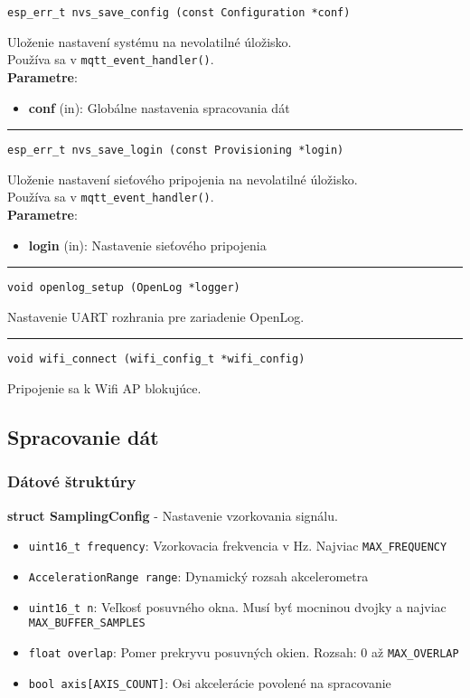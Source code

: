 \begin{lstlisting}[style=docs]
esp_err_t nvs_save_config (const Configuration *conf)
\end{lstlisting}
   Uloženie nastavení systému na nevolatilné úložisko. \\ Používa sa v \verb|mqtt_event_handler()|. \\
\textbf{Parametre}:
\begin{itemize}[noitemsep, topsep=0pt]
	\item \textbf{conf} (in): Globálne nastavenia spracovania dát
\end{itemize}
\bigbreak
\hrule

\begin{lstlisting}[style=docs]
esp_err_t nvs_save_login (const Provisioning *login)
\end{lstlisting}
   Uloženie nastavení sieťového pripojenia na nevolatilné úložisko. \\ Používa sa v \verb|mqtt_event_handler()|. \\
\textbf{Parametre}:
\begin{itemize}[noitemsep, topsep=0pt]
	\item \textbf{login} (in): Nastavenie sieťového pripojenia 
\end{itemize}
\bigbreak
\hrule

\begin{lstlisting}[style=docs]
void openlog_setup (OpenLog *logger)
\end{lstlisting}
Nastavenie UART rozhrania pre zariadenie OpenLog.
\bigbreak
\hrule

\begin{lstlisting}[style=docs]
void wifi_connect (wifi_config_t *wifi_config)
\end{lstlisting}
Pripojenie sa k Wifi AP blokujúce.


\subsection{Spracovanie dát} \label{modules:pipeline}

\subsubsection*{Dátové štruktúry}
\noindent\textbf{struct SamplingConfig} - Nastavenie vzorkovania signálu.
\begin{itemize}[noitemsep, topsep=0pt]
	\item \verb|uint16_t frequency|: Vzorkovacia frekvencia v Hz. Najviac \verb|MAX_FREQUENCY|
	\item \verb|AccelerationRange range|: Dynamický rozsah akcelerometra
	\item \verb|uint16_t n|: Veľkosť posuvného okna. Musí byť mocninou dvojky a najviac \verb|MAX_BUFFER_SAMPLES|
	\item \verb|float overlap|: Pomer prekryvu posuvných okien. Rozsah: 0 až \verb|MAX_OVERLAP|
	\item \verb|bool axis[AXIS_COUNT]|: Osi akcelerácie povolené na spracovanie
\end{itemize}
\bigbreak

